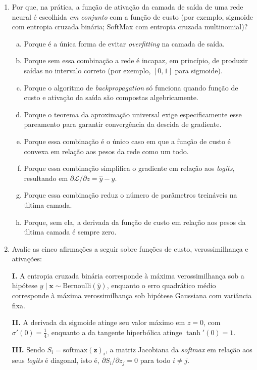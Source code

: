 \documentclass{dlproblemset}
\begin{document}
\begin{enumerate}[1)]
    \item Por que, na prática, a função de ativação da camada de saída de uma rede neural é escolhida \emph{em conjunto} com a função de custo (por exemplo, sigmoide com entropia cruzada binária; SoftMax com entropia cruzada multinomial)?
    \begin{enumerate}[(a)]
        \item Porque é a única forma de evitar \textit{overfitting} na camada de saída.
        \item Porque sem essa combinação a rede é incapaz, em princípio, de produzir saídas no intervalo correto (por exemplo, $[0, 1]$ para sigmoide).
        \item Porque o algoritmo de \textit{backpropagation} só funciona quando função de custo e ativação da saída são compostas algebricamente.
        \item Porque o teorema da aproximação universal exige especificamente esse pareamento para garantir convergência da descida de gradiente.
        \item Porque essa combinação é o único caso em que a função de custo é convexa em relação aos pesos da rede como um todo.
        \item Porque essa combinação simplifica o gradiente em relação aos \textit{logits}, resultando em $\partial \mathcal{L} / \partial z = \hat{y} - y$.
        \item Porque essa combinação reduz o número de parâmetros treináveis na última camada.
        \item Porque, sem ela, a derivada da função de custo em relação aos pesos da última camada é sempre zero.
    \end{enumerate}

    \item Avalie as cinco afirmações a seguir sobre funções de custo, verossimilhança e ativações:

    \textbf{I.} A entropia cruzada binária corresponde à máxima verossimilhança sob a hipótese $y \mid \mathbf{x} \sim \mathrm{Bernoulli}(\hat{y})$, enquanto o erro quadrático médio corresponde à máxima verossimilhança sob hipótese Gaussiana com variância fixa.

    \textbf{II.} A derivada da sigmoide atinge seu valor máximo em $z = 0$, com $\sigma'(0) = \tfrac{1}{4}$, enquanto a da tangente hiperbólica atinge $\tanh'(0) = 1$.

    \textbf{III.} Sendo $S_i = \mathrm{softmax}(\mathbf{z})_i$, a matriz Jacobiana da \textit{softmax} em relação aos seus \textit{logits} é diagonal, isto é, $\partial S_i / \partial z_j = 0$ para todo $i \neq j$.


\end{enumerate}
\end{document}
